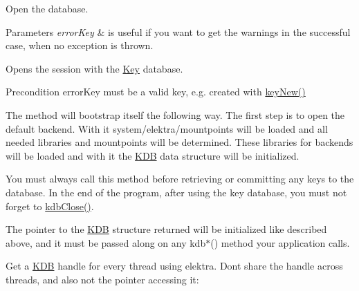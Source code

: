 Open the database. 


\begin{DoxyParams}{Parameters}
{\em error\+Key} & is useful if you want to get the warnings in the successful case, when no exception is thrown.\\
\hline
\end{DoxyParams}
Opens the session with the \mbox{\hyperlink{classkdb_1_1Key}{Key}} database. \begin{DoxyPrecond}{Precondition}
error\+Key must be a valid key, e.\+g. created with \mbox{\hyperlink{group__key_gad23c65b44bf48d773759e1f9a4d43b89}{key\+New()}}
\end{DoxyPrecond}
The method will bootstrap itself the following way. The first step is to open the default backend. With it system/elektra/mountpoints will be loaded and all needed libraries and mountpoints will be determined. These libraries for backends will be loaded and with it the {\ttfamily \mbox{\hyperlink{classkdb_1_1KDB}{K\+DB}}} data structure will be initialized.

You must always call this method before retrieving or committing any keys to the database. In the end of the program, after using the key database, you must not forget to \mbox{\hyperlink{group__kdb_gadb54dc9fda17ee07deb9444df745c96f}{kdb\+Close()}}.

The pointer to the {\ttfamily \mbox{\hyperlink{classkdb_1_1KDB}{K\+DB}}} structure returned will be initialized like described above, and it must be passed along on any kdb$\ast$() method your application calls.

Get a {\ttfamily \mbox{\hyperlink{classkdb_1_1KDB}{K\+DB}}} handle for every thread using elektra. Don\textquotesingle{}t share the handle across threads, and also not the pointer accessing it\+:


